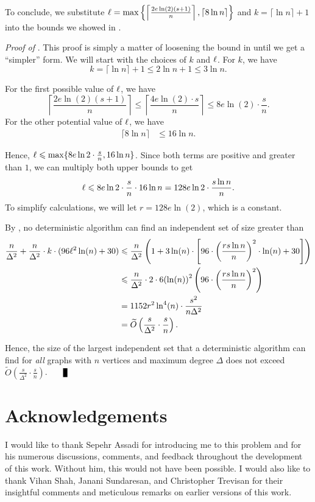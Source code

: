 \documentclass[11pt]{article}
\theoremstyle{definition}
\renewcommand{\qed}{\nobreak \ifvmode \relax \else
      \ifdim\lastskip<1.5em \hskip-\lastskip
      \hskip1.5em plus0em minus0.5em \fi \nobreak
      \vrule height0.75em width0.5em depth0.25em\fi}
\renewcommand{\leq}{\leqslant}
\renewcommand{\le}{\leq}
\newcommand{\Ot}{\ensuremath{\widetilde{O}}}
\begin{document}
To conclude, we substitute ${\ell}=\max\left\{\left\lceil\frac{2e\ln(2)(s+1)}n \right\rceil, \left\lceil8\ln n\right\rceil\right\}$ and $k=\lceil \ln n\rceil +1$ into the bounds we showed in .

\noindent
\textit{Proof of }. This proof is simply a matter of loosening the bound in  until we get a ``simpler'' form. We will start with the choices of $k$ and ${\ell}$. For $k$, we have
    \[
        k=\lceil\ln n\rceil+1 \le 2\ln n+1\le 3\ln n.
    \]

For the first possible value of $\ell$, we have
\[ 
    \left\lceil\frac{2e\ln(2)(s+1)}n \right\rceil\le \left\lceil\frac{4e\ln(2)\cdot s}n \right\rceil\le 8e\ln(2)\cdot \frac sn.
\]
For the other potential value of $\ell$, we have
\begin{align*}
    \lceil 8\ln n\rceil&\le 16\ln n.
\end{align*}

Hence, ${\distribFac}\le \max\{8e\ln 2\cdot \frac sn, 16\ln n\}$. Since both terms are positive and greater than $1$, we can multiply both upper bounds to get
\begin{align*}
    {\distribFac}\le 8e\ln 2\cdot \frac sn\cdot 16\ln n=128e\ln 2\cdot \frac {s\ln n}n.
\end{align*}
To simplify calculations, we will let $r=128e\ln(2)$, which is a constant.

By , no deterministic algorithm can find an independent set of size greater than
\begin{align*}
\frac{n}{\Delta^2}+\frac{n}{\Delta^2}\cdot k\cdot (96{\distribFac}^2\ln(n)+30)&\le \frac n{\Delta^2}\left(1+3\ln(n)\cdot \left[96\cdot {\left(\frac{rs\ln n}n\right)}^2\cdot \ln(n)+30\right]\right)\\
&\le \frac n{\Delta^2}\cdot 2\cdot 6{(\ln(n))}^2\left(96\cdot {\left(\frac{rs\ln n}n\right)}^2\right)\\
&=1152r^2\ln^4(n)\cdot\frac{s^2}{n\Delta^2}\\
&= \Ot\left(\frac s{\Delta^2}\cdot \frac sn\right).
\end{align*}

Hence, the size of the largest independent set that a deterministic algorithm can find for \textit{all} graphs with $n$ vertices and maximum degree $\Delta$ does not exceed $\Ot\left(\frac s{\Delta^2}\cdot \frac sn\right)$. $\qed$

\section*{Acknowledgements}
I would like to thank Sepehr Assadi for introducing me to this problem and for his numerous discussions, comments, and feedback throughout the development of this work. Without him, this would not have been possible. I would also like to thank Vihan Shah, Janani Sundaresan, and Christopher Trevisan for their insightful comments and meticulous remarks on earlier versions of this work.



\end{document}

